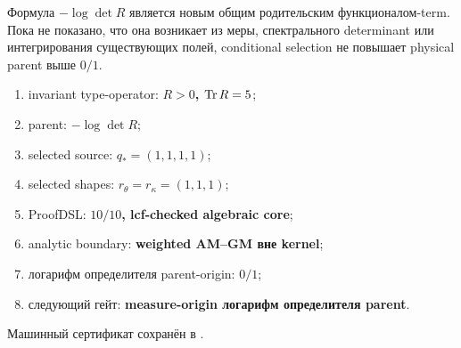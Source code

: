 \begin{nogocriterion}
Формула $-\log\det R$ является новым общим родительским функционалом-term. Пока не показано,
что она возникает из меры, спектрального determinant или интегрирования
существующих полей, conditional selection не повышает physical parent выше
$0/1$.
\end{nogocriterion}

\begin{protocol}\begin{enumerate}
\item invariant type-operator: \textbf{$R>0$, $\operatorname{Tr} R=5$};
\item parent: \textbf{$-\log\det R$};
\item selected source: \textbf{$q_*=(1,1,1,1)$};
\item selected shapes: \textbf{$r_\theta=r_\kappa=(1,1,1)$};
\item ProofDSL: \textbf{$10/10$, lcf-checked algebraic core};
\item analytic boundary: \textbf{weighted AM--GM вне kernel};
\item логарифм определителя parent-origin: \textbf{$0/1$};
\item следующий гейт: \textbf{measure-origin логарифм определителя parent}.
\end{enumerate}\end{protocol}

Машинный сертификат сохранён в
.